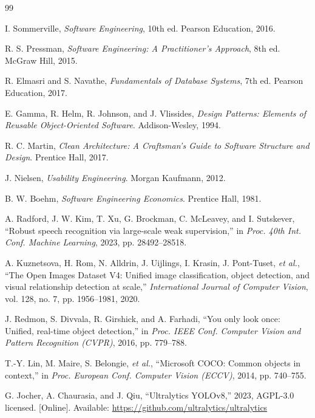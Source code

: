 \documentclass[
12pt,
a4paper,
oneside
]{report}
\begin{document}
\begin{thebibliography}{99}

I. Sommerville, \textit{Software Engineering}, 10th ed. Pearson Education,
2016.

R. S. Pressman, \textit{Software Engineering: A Practitioner's Approach},
8th ed. McGraw Hill, 2015.

R. Elmasri and S. Navathe, \textit{Fundamentals of Database Systems}, 7th ed.
Pearson Education, 2017.

E. Gamma, R. Helm, R. Johnson, and J. Vlissides, \textit{Design Patterns:
Elements of Reusable Object-Oriented Software}. Addison-Wesley, 1994.

R. C. Martin, \textit{Clean Architecture: A Craftsman's Guide to Software
Structure and Design}. Prentice Hall, 2017.

J. Nielsen, \textit{Usability Engineering}. Morgan Kaufmann, 2012.

B. W. Boehm, \textit{Software Engineering Economics}. Prentice Hall, 1981.

A. Radford, J. W. Kim, T. Xu, G. Brockman, C. McLeavey, and I. Sutskever,
``Robust speech recognition via large-scale weak supervision,'' in
\textit{Proc. 40th Int. Conf. Machine Learning}, 2023, pp. 28492--28518.

A. Kuznetsova, H. Rom, N. Alldrin, J. Uijlings, I. Krasin, J. Pont-Tuset,
\textit{et al.}, ``The Open Images Dataset V4: Unified image classification,
object detection, and visual relationship detection at scale,''
\textit{International Journal of Computer Vision}, vol. 128, no. 7,
pp. 1956--1981, 2020.

J. Redmon, S. Divvala, R. Girshick, and A. Farhadi, ``You only look once:
Unified, real-time object detection,'' in \textit{Proc. IEEE Conf. Computer
Vision and Pattern Recognition (CVPR)}, 2016, pp. 779--788.

T.-Y. Lin, M. Maire, S. Belongie, \textit{et al.}, ``Microsoft COCO: Common
objects in context,'' in \textit{Proc. European Conf. Computer Vision (ECCV)},
2014, pp. 740--755.

G. Jocher, A. Chaurasia, and J. Qiu, ``Ultralytics YOLOv8,'' 2023,
AGPL-3.0 licensed. [Online]. Available:
\url{https://github.com/ultralytics/ultralytics}


\end{thebibliography}
\end{document}
